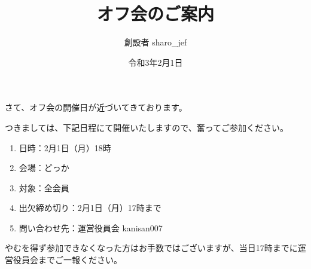 \documentclass[a4j,fleqn,12pt]{jsarticle}
\date{{\color{red}令和3}年{\color{red}2}月{\color{red}1}日}
\author{\color{red}創設者 sharo\_jef}
\title{\color{red}オフ会のご案内}
\begin{document}
\maketitle

\begin{haikei}
\jikou
\kansha

さて、オフ会の開催日が近づいてきております。

つきましては、下記日程にて開催いたしますので、奮ってご参加ください。
\end{haikei}

\begin{kigaki}
\begin{enumerate}
    \item 日時：2月1日（月）18時
    \item 会場：どっか
    \item 対象：全会員
    \item 出欠締め切り：2月1日（月）17時まで
    \item 問い合わせ先：運営役員会 kanisan007
\end{enumerate}

やむを得ず参加できなくなった方はお手数ではございますが、当日17時までに運営役員会までご一報ください。
\end{kigaki}
\end{document}
